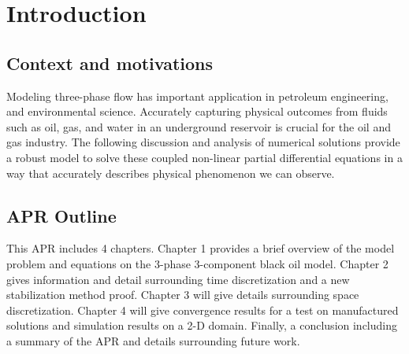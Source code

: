 \chapter{Introduction}
\label{sec:chapter_1_introduction}
\minitoc

\section{Context and motivations}
 Modeling 
three-phase flow has important application in petroleum engineering,
and environmental science. Accurately capturing physical outcomes from fluids such as oil, gas, and water
in an underground reservoir is crucial for the oil and gas industry. The
following discussion and analysis of numerical solutions provide a robust model
to solve these coupled non-linear partial differential equations in a way that
accurately describes physical phenomenon we can observe.
\section{APR Outline}
This APR includes 4 chapters. Chapter 1 provides a brief overview of the model problem and equations on the 3-phase 3-component black oil model. Chapter 2 gives information and detail surrounding time discretization and a new stabilization method proof. Chapter 3 will give details surrounding space discretization. Chapter 4 will give convergence results for a test on manufactured solutions and simulation results on a 2-D domain. Finally, a conclusion including a summary of the
APR and details surrounding future work.
	


